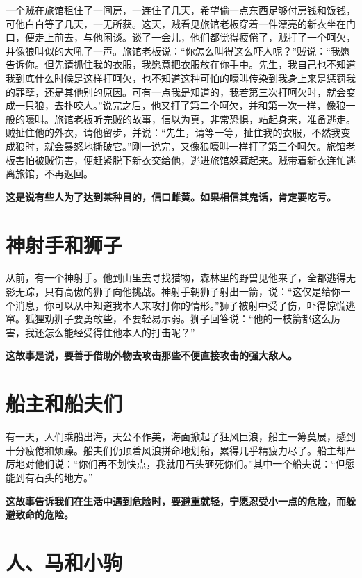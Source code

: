 一个贼在旅馆租住了一间房，一连住了几天，希望偷一点东西足够付房钱和饭钱，可他白白等了几天，一无所获。这天，贼看见旅馆老板穿着一件漂亮的新衣坐在门口，便走上前去，与他闲谈。谈了一会儿，他们都觉得疲倦了，贼打了一个呵欠，并像狼叫似的大吼了一声。旅馆老板说：“你怎么叫得这么吓人呢？”贼说：“我愿告诉你。但先请抓住我的衣服，我愿意把衣服放在你手中。先生，我自己也不知道我到底什么时候是这样打呵欠，也不知道这种可怕的嚎叫传染到我身上来是惩罚我的罪孽，还是其他别的原因。可有一点我是知道的，我若第三次打呵欠时，就会变成一只狼，去扑咬人。”说完之后，他又打了第二个呵欠，并和第一次一样，像狼一般的嚎叫。旅馆老板听完贼的故事，信以为真，非常恐惧，站起身来，准备逃走。贼扯住他的外衣，请他留步，并说：“先生，请等一等，扯住我的衣服，不然我变成狼时，就会暴怒地撕破它。”刚一说完，又像狼嚎叫一样打了第三个呵欠。旅馆老板害怕被贼伤害，便赶紧脱下新衣交给他，逃进旅馆躲藏起来。贼带着新衣连忙逃离旅馆，不再返回。

{\bfseries \color{red}这是说有些人为了达到某种目的，信口雌黄。如果相信其鬼话，肯定要吃亏。}

\section{神射手和狮子}

从前，有一个神射手。他到山里去寻找猎物，森林里的野兽见他来了，全都逃得无影无踪，只有高傲的狮子向他挑战。神射手朝狮子射出一箭，说：“这仅是给你一个消息，你可以从中知道我本人来攻打你的情形。”狮子被射中受了伤，吓得惊慌逃窜。狐狸劝狮子要勇敢些，不要轻易示弱。狮子回答说：“他的一枝箭都这么厉害，我还怎么能经受得住他本人的打击呢？”

{\bfseries \color{red}这故事是说，要善于借助外物去攻击那些不便直接攻击的强大敌人。}

\section{船主和船夫们}

有一天，人们乘船出海，天公不作美，海面掀起了狂风巨浪，船主一筹莫展，感到十分疲倦和烦躁。船夫们仍顶着风浪拼命地划船，累得几乎精疲力尽了。船主却严厉地对他们说：“你们再不划快点，我就用石头砸死你们。”其中一个船夫说：“但愿能到有石头的地方。”

{\bfseries \color{red}这故事告诉我们在生活中遇到危险时，要避重就轻，宁愿忍受小一点的危险，而躲避致命的危险。}

\section{人、马和小驹}

